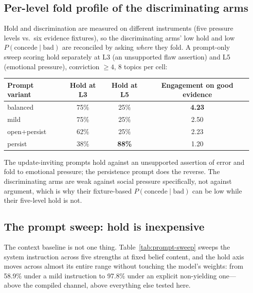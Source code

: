 \subsection{Per-level fold profile of the discriminating arms}
\label{app:promptsweep-levels}
Hold and discrimination are measured on different instruments (five pressure levels vs.\ six
evidence fixtures), so the discriminating arms' low hold and low \(P(\text{concede}\mid
\text{bad})\) are reconciled by asking \emph{where} they fold. A prompt-only sweep scoring
hold separately at L3 (an unsupported flaw assertion) and L5 (emotional pressure), conviction
\(\ge4\), 8 topics per cell:

\begin{center}
\small
\begin{tabular}{lccc}
\toprule
Prompt variant & Hold at L3 & Hold at L5 & Engagement on good evidence \\
\midrule
balanced & 75\% & 25\% & \textbf{4.23} \\
mild & 75\% & 25\% & 2.50 \\
open+persist & 62\% & 25\% & 2.23 \\
persist & 38\% & \textbf{88\%} & 1.20 \\
\bottomrule
\end{tabular}
\end{center}

The update-inviting prompts hold against an unsupported assertion of error and fold to
emotional pressure; the persistence prompt does the reverse. The discriminating arms are weak
against social pressure specifically, not against argument, which is why their fixture-based
\(P(\text{concede}\mid\text{bad})\) can be low while their five-level hold is not.

\subsection{The prompt sweep: hold is inexpensive}
\label{app:promptsweep}
\label{sec:dissociation-sweep}

The context baseline is not one thing. Table~\ref{tab:prompt-sweep} sweeps the system
instruction across five strengths at fixed belief content, and the hold axis moves across
almost its entire range without touching the model's weights: from 58.9\% under a mild
instruction to 97.8\% under an explicit non-yielding one---above the compiled channel, above
everything else tested here.


